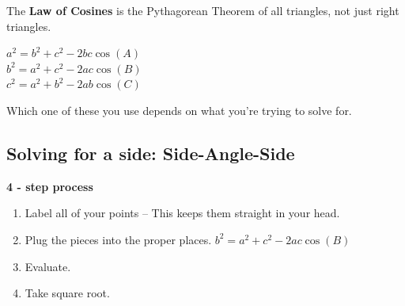 \documentclass[12pt]{article}
\begin{document}
The \textbf{Law of Cosines} is the Pythagorean Theorem of all triangles, not just right triangles.

\begin{center}

$a^2=b^2+c^2-2bc\cos(A)$\\

$b^2=a^2+c^2-2ac\cos(B)$\\

$c^2=a^2+b^2-2ab\cos(C)$\\

\end{center}

Which one of these you use depends on what you're trying to solve for.\\

\hrulefill

\subsection*{Solving for a side: Side-Angle-Side}



\textbf{4 - step process}

\begin{enumerate}

\item Label all of your points -- This keeps them straight in your head.\\

\item Plug the pieces into the proper places. $b^2=a^2+c^2-2ac\cos(B)$\\

\item Evaluate.\\

\item Take square root.\\
\end{enumerate}

\begin{center}
\end{center}
\end{document}
